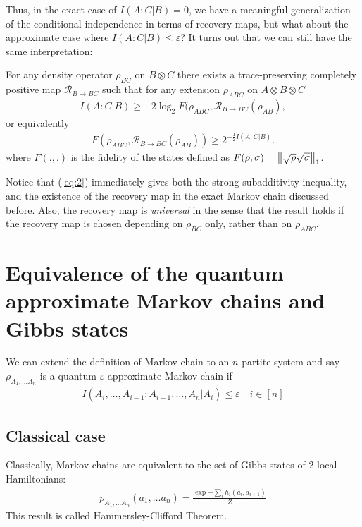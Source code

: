 \documentclass{article}
\begin{document}
Thus, in the exact case of $I(A:C|B)=0$, we have a meaningful generalization of the conditional independence in terms of recovery maps, but what about the approximate case where $I(A:C|B)\leq \varepsilon$? It turns out \cite{HJPW04} that we can still have the same interpretation:
\begin{thm}
	For any density operator $\rho_{BC}$ on $B\otimes C$ there exists a trace-preserving completely positive map $\mathcal{R}_{B\rightarrow BC}$ such that for any extension $\rho_{ABC}$ on $A \otimes B \otimes C$ 
	\begin{align}\label{eq:2}
		I(A : C|B) \geq -2\log_2 F(\rho_{ABC},\mathcal{R}_{B\rightarrow BC}(\rho_{AB}),
	\end{align}
	or equivalently 
	\begin{align}
		F(\rho_{ABC},\mathcal{R}_{B\rightarrow BC}(\rho_{AB}))\geq 2^{-\frac{1}{2}I(A:C|B)}.
	\end{align}
	where $F(.,.)$ is the fidelity of the states defined as $F(\rho,\sigma)=\left\|{\sqrt{\rho}\sqrt{\sigma}}\right\|_1$.
\end{thm}
Notice that (\ref{eq:2}) immediately gives both the strong subadditivity inequality, and the existence of the recovery map in the exact Markov chain discussed before. Also,  the recovery map is \textit{universal} in the sense that the result holds if the recovery map is chosen depending on $\rho_{BC}$ only, rather than on $\rho_{ABC}$.\\


\section{Equivalence of the quantum approximate Markov chains and Gibbs states}

We can extend the definition of Markov chain to an $n$-partite system and say $\rho_{A_1,\dots A_n}$ is a quantum $\varepsilon$-approximate Markov chain if 
\begin{align}
	I(A_i,\dots,A_{i-1}:A_{i+1},\dots ,A_n|A_i)\leq \varepsilon \quad i\in [n]
\end{align}

\subsection{Classical case}
Classically, Markov chains are equivalent to the set of Gibbs states of 2-local Hamiltonians:
\begin{align}
	p_{A_1,\dots A_n}(a_1,\dots a_n)=\frac{\exp{-\sum_i h_i(a_i,a_{i+1})}}{Z}
\end{align}
This result is called Hammersley-Clifford Theorem. 
\end{document}
